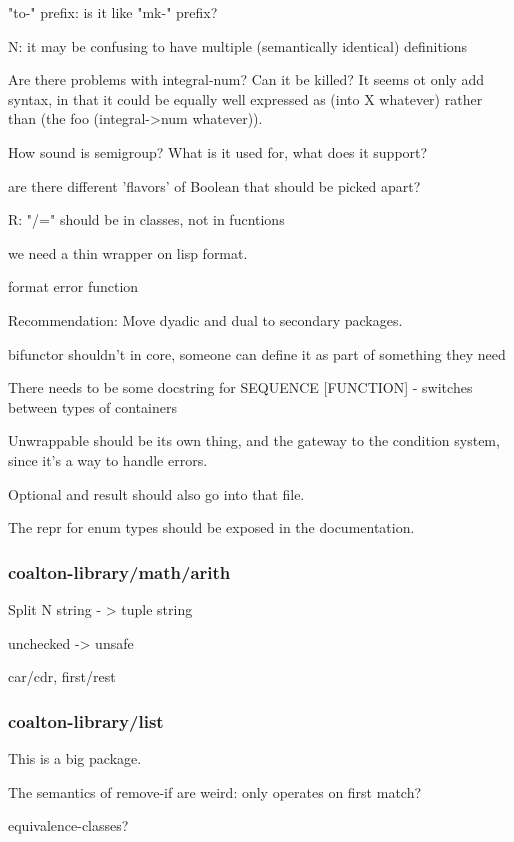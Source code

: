 \documentclass[12pt]{article}
\begin{document}
"to-" prefix: is it like "mk-" prefix?

N: it may be confusing to have multiple (semantically identical)
definitions

Are there problems with integral-\gt{}num? Can it be killed? It seems
ot only add syntax, in that it could be equally well expressed as
(into X whatever) rather than (the foo (integral->num whatever)).

How sound is semigroup? What is it used for, what does it support?

are there different 'flavors' of Boolean that should be picked apart?

R: "/=" should be in classes, not in fucntions

we need a thin wrapper on lisp format.

format error function

Recommendation: Move dyadic and dual to secondary packages.

bifunctor shouldn't in core, someone can define it as part of
      something they need

There needs to be some docstring for SEQUENCE [FUNCTION] - switches between types of containers

Unwrappable should be its own thing, and the gateway to the condition
system, since it's a way to handle errors.

Optional and result should also go into that file.

The repr for enum types should be exposed in the documentation.

\subsubsection{coalton-library/math/arith}

Split N string - > tuple string

unchecked -> unsafe

car/cdr,  first/rest

\subsubsection{coalton-library/list}

This is a big package.

The semantics of remove-if are weird: only operates on first match?

equivalence-classes?
\end{document}
